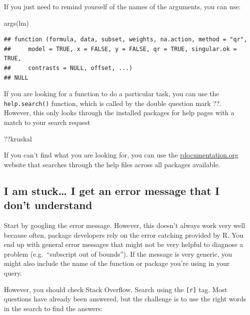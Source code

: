 \documentclass[
]{book}
\newenvironment{Shaded}{\begin{snugshade}}{\end{snugshade}}
\newcommand{\FunctionTok}[1]{\textcolor[rgb]{0.00,0.00,0.00}{#1}}
\newcommand{\NormalTok}[1]{#1}
\begin{document}
If you just need to remind yourself of the names of the arguments, you can use:

\begin{Shaded}
\begin{Highlighting}[]
\FunctionTok{args}\NormalTok{(lm)}
\end{Highlighting}
\end{Shaded}

\begin{verbatim}
## function (formula, data, subset, weights, na.action, method = "qr", 
##     model = TRUE, x = FALSE, y = FALSE, qr = TRUE, singular.ok = TRUE, 
##     contrasts = NULL, offset, ...) 
## NULL
\end{verbatim}

If you are looking for a function to do a particular task, you can use the \texttt{help.search()} function, which is called by the double question mark ??. However, this only looks through the installed packages for help pages with a match to your search request

\begin{Shaded}
\begin{Highlighting}[]
\NormalTok{??kruskal}
\end{Highlighting}
\end{Shaded}

If you can't find what you are looking for, you can use the \href{https://www.rdocumentation.org}{rdocumentation.org} website that searches through the help files across all packages available.

\hypertarget{i-am-stuck-i-get-an-error-message-that-i-dont-understand}{%
\subsection*{I am stuck\ldots{} I get an error message that I don't understand}\label{i-am-stuck-i-get-an-error-message-that-i-dont-understand}}

Start by googling the error message. However, this doesn't always work very well because often, package developers rely on the error catching provided by R. You end up with general error messages that might not be very helpful to diagnose a problem (e.g.~``subscript out of bounds''). If the message is very generic, you might also include the name of the function or package you're using in your query.

However, you should check Stack Overflow. Search using the \texttt{{[}r{]}} tag. Most questions have already been answered, but the challenge is to use the right words in the search to find the answers: \href{http://stackoverflow.com/questions/tagged/r}{}
\end{document}
